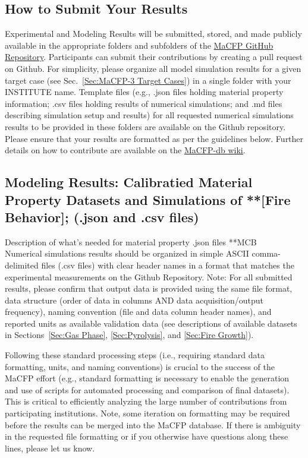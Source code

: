 \documentclass[12pt]{article}
\begin{document}
\subsection{How to Submit Your Results}
Experimental and Modeling Results will be submitted, stored, and made publicly available in the appropriate folders and subfolders of the \href{https://github.com/MaCFP/}{MaCFP GitHub Repository}. Participants can submit their contributions by creating a pull request on Github. For simplicity, please organize all model simulation results for a given target case (see Sec.~\ref{Sec:MaCFP-3 Target Cases}) in a single folder with your INSTITUTE name.  Template files (e.g., .json files holding material property information; .csv files holding results of numerical simulations; and .md files describing simulation setup and results) for all requested numerical simulations results to be provided in these folders are available on the Github repository. Please ensure that your results are formatted as per the guidelines below. Further details on how to contribute are available on the \href{https://github.com/MaCFP/macfp-db/wiki/How-to-Contribute}{MaCFP-db wiki}. 

\subsection{Modeling Results: Calibratied Material Property Datasets and Simulations of **[Fire Behavior]; (.json and .csv files)}
Description of what's needed for material property .json files **MCB\\

Numerical simulations results should be organized in simple ASCII comma-delimited files (.csv files) with clear header names in a format that matches the experimental measurements on the Github Repository. 
Note: For all submitted results, please confirm that output data is provided using the same file format, data structure (order of data in columns AND data acquisition/output frequency), naming convention (file and data column header names), and reported units as available validation data (see descriptions of available datasets in Sections~\ref{Sec:Gas Phase}, \ref{Sec:Pyrolysis}, and \ref{Sec:Fire Growth}). 

Following these standard processing steps (i.e., requiring standard data formatting, units, and naming conventions) is crucial to the success of the MaCFP effort (e.g., standard formatting is necessary to enable the generation and use of scripts for automated processing and comparison of final datasets). This is critical to efficiently analyzing the large number of contributions from participating institutions. Note, some iteration on formatting may be required before the results can be merged into the MaCFP database. If there is ambiguity in the requested file formatting or if you otherwise have questions along these lines, please let us know.
\end{document}
